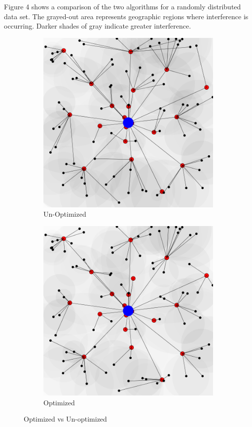 \documentclass{sigcomm-alternate}
\begin{document}
Figure 4 shows a comparison of the two algorithms for a randomly distributed data set. The grayed-out area represents geographic regions where interference is occurring. Darker shades of gray indicate greater interference.

\begin{figure}[ht]
\centering
\begin{subfigure}{0.45\linewidth}
\includegraphics[scale=0.15]{UnOpt.png}
\caption{Un-Optimized}
\end{subfigure}
\quad
\begin{subfigure}{0.45\linewidth}
\includegraphics[scale=0.15]{opt.png}
\caption{Optimized}
\end{subfigure}
\caption{Optimized vs Un-optimized}
\end{figure}
\end{document}
